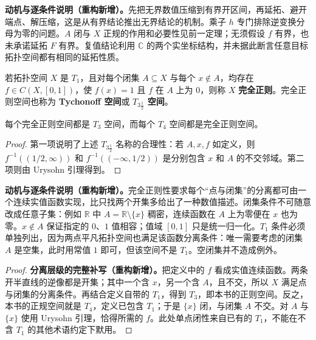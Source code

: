 \documentclass[../../main.tex]{subfiles}%
\begin{document}
\begin{remark}
\textbf{动机与逐条件说明（重构新增）。}先把无界数值压缩到有界开区间，再延拓、避开端点、解压缩，这是从有界结论推出无界结论的机制。乘子 $h$ 专门排除逆变换分母为零的问题。$A$ 闭与 $X$ 正规的作用和必要性见前一定理；无须假设 $f$ 有界，也未承诺延拓 $F$ 有界。复值结论利用 $\mathbb C$ 的两个实坐标结构，并未据此断言任意目标拓扑空间都有相同的延拓性质。
\end{remark}
\begin{definition}[完全正则空间]\label{definition:ch04-completely-regular}
若拓扑空间 $X$ 是 $T_1$，且对每个闭集 $A\subseteq X$ 与每个 $x\notin A$，均存在 $f\in C(X,[0,1])$，使 $f(x)=1$ 且 $f$ 在 $A$ 上为 $0$，则称 $X$ \textbf{完全正则}。完全正则空间也称为 \textbf{Tychonoff 空间}或 \textbf{$T_{3\frac12}$ 空间}。
\end{definition}
\begin{proposition}\label{proposition:ch04-complete-regular-hierarchy}
每个完全正则空间都是 $T_3$ 空间，而每个 $T_4$ 空间都是完全正则空间。
\end{proposition}
\begin{proof}
第一项说明了上述 $T_{3\frac12}$ 名称的合理性：若 $A,x,f$ 如定义，则 $f^{-1}((1/2,\infty))$ 和 $f^{-1}((-\infty,1/2))$ 是分别包含 $x$ 和 $A$ 的不交邻域。第二项则由 Urysohn 引理得到。
\end{proof}
\begin{remark}
\textbf{动机与逐条件说明（重构新增）。}完全正则性要求每个“点与闭集”的分离都可由一个连续实值函数实现，比只找两个开集多给出了一种数值描述。闭集条件不可随意改成任意子集：例如 $\mathbb R$ 中 $A=\mathbb R\setminus\{x\}$ 稠密，连续函数在 $A$ 上为零便在 $x$ 也为零。$x\notin A$ 保证指定的 $0$、$1$ 值相容；值域 $[0,1]$ 只是统一归一化。$T_1$ 条件必须单独列出，因为两点平凡拓扑空间也满足该函数分离条件：唯一需要考虑的闭集 $A$ 是空集，此时用常值 $1$ 即可，但该空间不是 $T_1$。空闭集并不造成例外。
\end{remark}
\begin{proof}
\textbf{分离层级的完整补写（重构新增）。}把定义中的 $f$ 看成实值连续函数。两条开半直线的逆像都是开集；其中一个含 $x$，另一个含 $A$，且不交，所以 $X$ 满足点与闭集的分离条件。再结合定义自带的 $T_1$，得到 $T_3$，即本书的正则空间。反之，本书的正规空间就是 $T_4$，定义已包含 $T_1$；于是 $\{x\}$ 闭，与闭集 $A$ 不交。对 $A$ 与 $\{x\}$ 使用 Urysohn 引理，恰得所需的 $f$。此处单点闭性来自已有的 $T_1$，不能在不含 $T_1$ 的其他术语约定下默用。
\end{proof}
\end{document}
